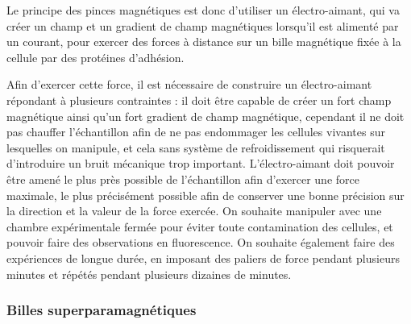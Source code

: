 \documentclass{report}
\begin{document}
Le principe des pinces magnétiques est donc d'utiliser un électro-aimant, qui va créer un champ et un gradient de champ magnétiques lorsqu'il est alimenté par un courant, pour exercer des forces à distance sur un bille magnétique fixée à la cellule par des protéines d'adhésion. 	 
	 
	 
	 Afin d'exercer cette force, il est nécessaire de construire un électro-aimant répondant à plusieurs contraintes : il doit être capable de créer un fort champ magnétique ainsi qu'un fort gradient de champ magnétique, cependant il ne doit pas chauffer l'échantillon afin de ne pas endommager les cellules vivantes sur lesquelles on manipule, et cela sans système de refroidissement qui risquerait d'introduire un bruit mécanique trop important. L'électro-aimant doit pouvoir être amené le plus près possible de l'échantillon afin d'exercer une force maximale, le plus précisément possible afin de conserver une bonne précision sur la direction et la valeur de la force exercée. On souhaite manipuler avec une chambre expérimentale fermée pour éviter toute contamination des cellules, et pouvoir faire des observations en fluorescence. On souhaite également faire des expériences de longue durée, en imposant des paliers de force pendant plusieurs minutes et répétés pendant plusieurs dizaines de minutes.	
	
		\subsubsection{Billes superparamagnétiques}
		
\end{document}
